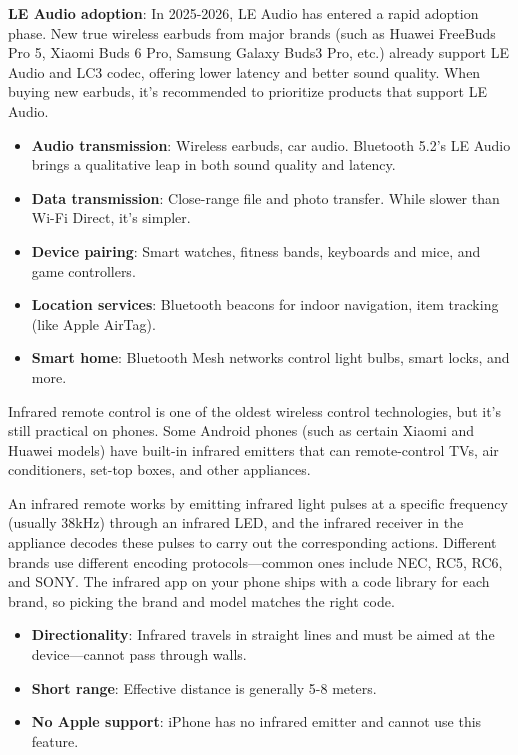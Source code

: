 \textbf{LE Audio adoption}: In 2025-2026, LE Audio has entered a rapid adoption phase. New true wireless earbuds from major brands (such as Huawei FreeBuds Pro 5, Xiaomi Buds 6 Pro, Samsung Galaxy Buds3 Pro, etc.) already support LE Audio and LC3 codec, offering lower latency and better sound quality. When buying new earbuds, it's recommended to prioritize products that support LE Audio.


\begin{itemize}
  \item \textbf{Audio transmission}: Wireless earbuds, car audio. Bluetooth 5.2's LE Audio brings a qualitative leap in both sound quality and latency.
  \item \textbf{Data transmission}: Close-range file and photo transfer. While slower than Wi-Fi Direct, it's simpler.
  \item \textbf{Device pairing}: Smart watches, fitness bands, keyboards and mice, and game controllers.
  \item \textbf{Location services}: Bluetooth beacons for indoor navigation, item tracking (like Apple AirTag).
  \item \textbf{Smart home}: Bluetooth Mesh networks control light bulbs, smart locks, and more.
\end{itemize}


Infrared remote control is one of the oldest wireless control technologies, but it's still practical on phones. Some Android phones (such as certain Xiaomi and Huawei models) have built-in infrared emitters that can remote-control TVs, air conditioners, set-top boxes, and other appliances.


An infrared remote works by emitting infrared light pulses at a specific frequency (usually 38kHz) through an infrared LED, and the infrared receiver in the appliance decodes these pulses to carry out the corresponding actions. Different brands use different encoding protocols—common ones include NEC, RC5, RC6, and SONY. The infrared app on your phone ships with a code library for each brand, so picking the brand and model matches the right code.


\begin{itemize}
  \item \textbf{Directionality}: Infrared travels in straight lines and must be aimed at the device—cannot pass through walls.
  \item \textbf{Short range}: Effective distance is generally 5-8 meters.
  \item \textbf{No Apple support}: iPhone has no infrared emitter and cannot use this feature.
\end{itemize}

